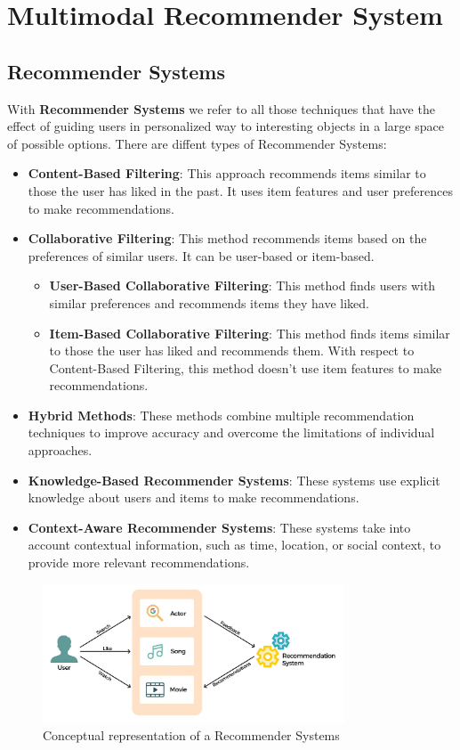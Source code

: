 \section{Multimodal Recommender System}
\subsection{Recommender Systems}
With \textbf{Recommender Systems} we refer to all those techniques that have the effect of guiding users in personalized way to interesting objects in a large space of possible options\cite{Lops2011}. There are diffent types of Recommender Systems:
\begin{itemize}
    \item \textbf{Content-Based Filtering}: This approach recommends items similar to those the user has liked in the past. It uses item features and user preferences to make recommendations.
    \item \textbf{Collaborative Filtering}: This method recommends items based on the preferences of similar users. It can be user-based or item-based.
    \begin{itemize}
        \item \textbf{User-Based Collaborative Filtering}: This method finds users with similar preferences and recommends items they have liked.
        \item \textbf{Item-Based Collaborative Filtering}: This method finds items similar to those the user has liked and recommends them. With respect to Content-Based Filtering, this method doesn't use item features to make recommendations.
    \end{itemize}
    \item \textbf{Hybrid Methods}: These methods combine multiple recommendation techniques to improve accuracy and overcome the limitations of individual approaches.
    \item \textbf{Knowledge-Based Recommender Systems}: These systems use explicit knowledge about users and items to make recommendations.
    \item \textbf{Context-Aware Recommender Systems}: These systems take into account contextual information, such as time, location, or social context, to provide more relevant recommendations.
\end{itemize}

\begin{figure}[H]
    \centering
    \includegraphics[height=0.2\textheight ,width=0.8\textwidth]{img/RecSys.png}
    \caption{Conceptual representation of a Recommender Systems}
\end{figure}

